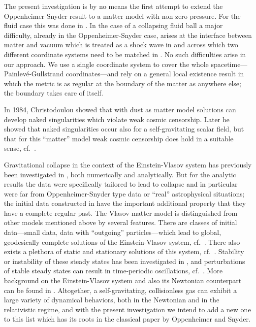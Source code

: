 \documentclass[11pt]{article}
\begin{document}
The present investigation is by no means the first attempt to extend the
Oppenheimer-Snyder result to a matter model with non-zero pressure.
For the fluid case this was done in \cite{ST94}. In the case of a collapsing
fluid ball a major difficulty, already in the Oppenheimer-Snyder
case, arises at the interface between matter and vacuum which is treated as
a shock wave in \cite{ST94} and across which two different coordinate systems
need to be matched in \cite{OS}. No such difficulties arise in our approach.
We use a single coordinate system to cover the whole
spacetime---Painlev\'{e}-Gullstrand coordinates---and rely on a general
local existence
result in which the metric is as regular at the boundary of the matter as
anywhere else; the boundary takes care of itself.

In 1984, {\sc Christodoulou} \cite{chrnd} showed that
with dust as matter model solutions can 
develop naked singularities which violate weak cosmic censorship.
Later he showed that naked singularities occur also
for a self-gravitating scalar field,
but that for this ``matter'' model weak cosmic censorship does hold
in a suitable sense, cf.~\cite{Chr86,Chr87,Chr91,Chr93,Chr94,Chr99a,Chr99}.

Gravitational collapse in the context of the Einstein-Vlasov system
has previously been investigated in
\cite{AAR1,AAR2,An2,AKR10,AKR11,AR06,AR10,AR10b,OChop,RRS},
both numerically and analytically. But for the analytic results the data were
specifically tailored to lead to collapse and in particular were far from
Oppenheimer-Snyder type data or ``real'' astrophysical situations;
the initial data constructed in \cite{An2} have the
important additional property that they have a complete regular past.
The Vlasov matter model is distinguished from other models mentioned
above by several features. There are classes of initial
data---small data, data with ``outgoing'' particles---which lead
to global, geodesically complete solutions of the Einstein-Vlasov system,
cf.~\cite{AKR08,FaJoSm,LiTa19,RR}. There also exists a plethora of static and stationary solutions of this system, cf.~\cite{An0,An3,AFT,AKR14,RaRe,Rein94, RR00}. Stability or instability
of these steady states has been investigated in
\cite{GueStrRe,HaLinRe,HaRe2013,HaRe2014}, and perturbations of stable
steady states can result in time-periodic oscillations,
cf.~\cite{AR06,GueStrRe}. More background on the Einstein-Vlasov system
and also its Newtonian counterpart can be found in \cite{AGS,An1,GB,rein07}.
Altogether, a self-gravitating, collisionless gas can exhibit a large
variety of dynamical behaviors, both in the Newtonian and in the relativistic
regime, and with the present investigation we intend to add a new
one to this list which has its roots in the classical paper \cite{OS} 
by {\sc Oppenheimer} and {\sc Snyder}.
\end{document}
